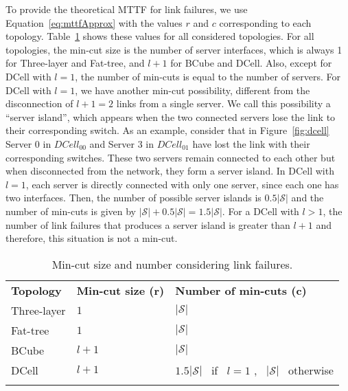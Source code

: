 To provide the theoretical MTTF for link failures, we use Equation~\ref{eq:mttfApprox} with the values $r$ and $c$ corresponding to each topology. Table~\ref{tab:cuts_link} shows these values for all considered topologies. For all topologies, the min-cut size is the number of server interfaces, which is always 1 for Three-layer and Fat-tree, and $l+1$ for BCube and DCell. Also, except for DCell with $l=1$, the number of min-cuts is equal to the number of servers. For DCell with $l=1$, we have another min-cut possibility, different from the disconnection of $l+1=2$ links from a single server. We call this possibility a ``server island'', which appears when the two connected servers lose the link to their corresponding switch. 
As an example, consider that in Figure~\ref{fig:dcell} Server 0 in $DCell_00$ and Server 3 in $DCell_01$ have lost the link with their corresponding switches. These two servers remain connected to each other but when disconnected from the network, they form a server island.
In DCell with $l=1$, each server is directly connected with only one server, since each one has two interfaces. Then, the number of possible server islands is $0.5|\mathcal{S}|$ and the number of min-cuts is given by $|\mathcal{S}| + 0.5|\mathcal{S}| = 1.5|\mathcal{S}|$. For a DCell with $l>1$, the number of link failures that produces a server island is greater than $l+1$ and therefore, this situation is not a min-cut.
\begin{table}
\caption{Min-cut size and number considering link failures.}
\label{tab:cuts_link}
\begin{tabular}{lll}
\hline\noalign{\smallskip}
\hline \textbf{Topology}			&\textbf{Min-cut size (r)} &\textbf{Number of min-cuts (c)}\\
\noalign{\smallskip}\hline\noalign{\smallskip}
Three-layer	&$1$ &$|\mathcal{S}|$\\
Fat-tree &$1$ &$|\mathcal{S}|$ \\
BCube &$l+1$ &$|\mathcal{S}|$ \\
DCell &$l+1$ &$1.5|\mathcal{S}|$ \ if \, $l=1$ , \, $|\mathcal{S}|$ \, otherwise\\
\noalign{\smallskip}\hline
\end{tabular}
\end{table}

